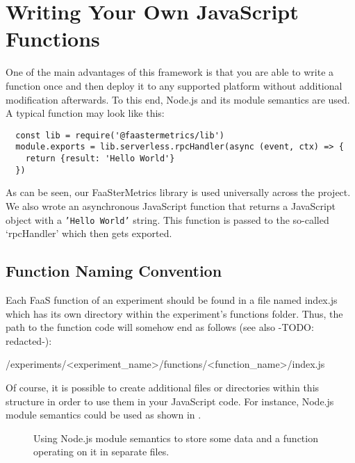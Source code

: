 \documentclass[../main.tex]{subfiles}
\begin{document}
\section{Writing Your Own JavaScript Functions}\label{sec:jsFunctions}

One of the main advantages of this framework is that you are able to write a function once 
and then deploy it to any supported platform without additional modification afterwards.
To this end, Node.js and its module semantics are used. A typical function may look like this:

\begin{tcolorbox}
\begin{verbatim}
  const lib = require('@faastermetrics/lib')
  module.exports = lib.serverless.rpcHandler(async (event, ctx) => {
    return {result: 'Hello World'}
  })
\end{verbatim}
\end{tcolorbox}

As can be seen, our FaaSterMetrics library is used universally across the project. 
We also wrote an asynchronous JavaScript function that returns a JavaScript object with a \texttt{'Hello World'} string. 
This function is passed to the so-called `rpcHandler' which then gets exported. 

\subsection{Function Naming Convention}

Each FaaS function of an experiment should be found in a file named index.js which has its own directory within the experiment's functions folder.
Thus, the path to the function code will somehow end as follows (see also -TODO: redacted-):

\begin{tcolorbox}
  /experiments/<experiment\_name>/functions/<function\_name>/index.js
\end{tcolorbox}

Of course, it is possible to create additional files or directories within this structure in order to use them in your JavaScript code.
For instance, Node.js module semantics could be used as shown in .

\begin{figure}
\begin{center}
\end{center}
\caption{Using Node.js module semantics to store some data and a function operating on it in separate files.}
\label{fig:dividingDataAndFunctionCodeNodeJS}
\end{figure}
\end{document}
